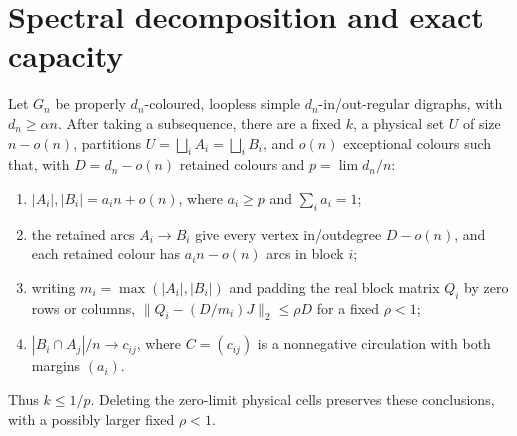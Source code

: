 \section{Spectral decomposition and exact capacity}
\label{gad:section}\label{gcp:section}
\begin{lemma}\label{gad:decomposition}
Let $G_n$ be properly $d_n$-coloured, loopless simple $d_n$-in/out-regular digraphs, with $d_n\ge\alpha{}n$. After taking a subsequence, there are a fixed $k$, a physical set $U$ of size $n-o(n)$, partitions $U=\bigsqcup_iA_i=\bigsqcup_iB_i$, and $o(n)$ exceptional colours such that, with $D=d_n-o(n)$ retained colours and $p=\lim{}d_n/n$:
\begin{enumerate}[label=(\roman*)]
\item $|A_i|,|B_i|=a_in+o(n)$, where $a_i\ge{}p$ and $\sum_ia_i=1$;
\item the retained arcs $A_i\to{}B_i$ give every vertex in/outdegree $D-o(n)$, and each retained colour has $a_in-o(n)$ arcs in block $i$;
\item writing $m_i=\max(|A_i|,|B_i|)$ and padding the real block matrix $Q_i$ by zero rows or columns, $\|Q_i-(D/m_i)J\|_2\le\rho{}D$ for a fixed $\rho<1$;
\item $|B_i\cap{}A_j|/n\to{}c_{ij}$, where $C=(c_{ij})$ is a nonnegative circulation with both margins $(a_i)$.
\end{enumerate}
Thus $k\le1/p$. Deleting the zero-limit physical cells preserves these conclusions, with a possibly larger fixed $\rho<1$.
\end{lemma}
